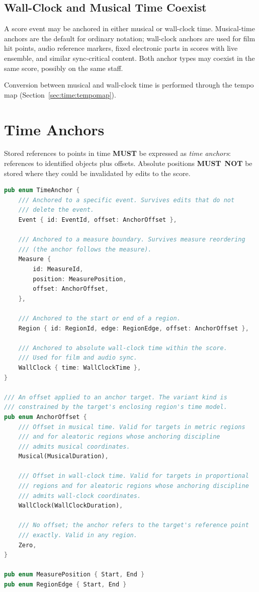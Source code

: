 \documentclass[11pt,letterpaper]{report}
\newcommand{\MUST}{\textbf{MUST}}
\newcommand{\MUSTNOT}{\textbf{MUST}\nobreak\ \textbf{NOT}}
\begin{document}
\subsection{Wall-Clock and Musical Time Coexist}

A score event may be anchored in either musical or wall-clock time.
Musical-time anchors are the default for ordinary notation; wall-clock
anchors are used for film hit points, audio reference markers, fixed
electronic parts in scores with live ensemble, and similar
sync-critical content. Both anchor types may coexist in the same
score, possibly on the same staff.

Conversion between musical and wall-clock time is performed through
the tempo map (Section~\ref{sec:time:tempomap}).

\section{Time Anchors}
\label{sec:time:anchors}

Stored references to points in time \MUST{} be expressed as
\emph{time anchors}: references to identified objects plus offsets.
Absolute positions \MUSTNOT{} be stored where they could be invalidated
by edits to the score.

\begin{lstlisting}[language=Rust]
pub enum TimeAnchor {
    /// Anchored to a specific event. Survives edits that do not
    /// delete the event.
    Event { id: EventId, offset: AnchorOffset },

    /// Anchored to a measure boundary. Survives measure reordering
    /// (the anchor follows the measure).
    Measure {
        id: MeasureId,
        position: MeasurePosition,
        offset: AnchorOffset,
    },

    /// Anchored to the start or end of a region.
    Region { id: RegionId, edge: RegionEdge, offset: AnchorOffset },

    /// Anchored to absolute wall-clock time within the score.
    /// Used for film and audio sync.
    WallClock { time: WallClockTime },
}

/// An offset applied to an anchor target. The variant kind is
/// constrained by the target's enclosing region's time model.
pub enum AnchorOffset {
    /// Offset in musical time. Valid for targets in metric regions
    /// and for aleatoric regions whose anchoring discipline
    /// admits musical coordinates.
    Musical(MusicalDuration),

    /// Offset in wall-clock time. Valid for targets in proportional
    /// regions and for aleatoric regions whose anchoring discipline
    /// admits wall-clock coordinates.
    WallClock(WallClockDuration),

    /// No offset; the anchor refers to the target's reference point
    /// exactly. Valid in any region.
    Zero,
}

pub enum MeasurePosition { Start, End }
pub enum RegionEdge { Start, End }
\end{lstlisting}
\end{document}
